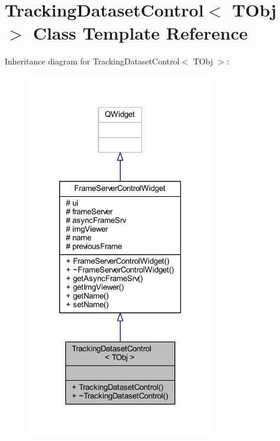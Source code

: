 \hypertarget{class_tracking_dataset_control}{}\section{Tracking\+Dataset\+Control$<$ T\+Obj $>$ Class Template Reference}
\label{class_tracking_dataset_control}


Inheritance diagram for Tracking\+Dataset\+Control$<$ T\+Obj $>$\+:
\nopagebreak
\begin{figure}[H]
\begin{center}
\leavevmode
\includegraphics[width=234pt]{class_tracking_dataset_control__inherit__graph}
\end{center}
\end{figure}


